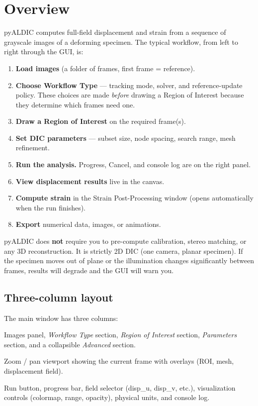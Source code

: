 \section{Overview}
\label{sec:overview}

pyALDIC computes full-field displacement and strain from a sequence
of grayscale images of a deforming specimen. The typical workflow,
from left to right through the GUI, is:

\begin{enumerate}
  \item \textbf{Load images} (a folder of frames, first frame = reference).
  \item \textbf{Choose Workflow Type} --- tracking mode, solver, and
    reference-update policy. These choices are made \emph{before}
    drawing a Region of Interest because they determine which frames
    need one.
  \item \textbf{Draw a Region of Interest} on the required frame(s).
  \item \textbf{Set DIC parameters} --- subset size, node spacing,
    search range, mesh refinement.
  \item \textbf{Run the analysis.} Progress, Cancel, and console log
    are on the right panel.
  \item \textbf{View displacement results} live in the canvas.
  \item \textbf{Compute strain} in the Strain Post-Processing window
    (opens automatically when the run finishes).
  \item \textbf{Export} numerical data, images, or animations.
\end{enumerate}

\begin{notebox}
pyALDIC does \textbf{not} require you to pre-compute calibration,
stereo matching, or any 3D reconstruction. It is strictly 2D DIC
(one camera, planar specimen). If the specimen moves out of plane or
the illumination changes significantly between frames, results will
degrade and the GUI will warn you.
\end{notebox}

\subsection{Three-column layout}

The main window has three columns:

\begin{description}[leftmargin=1.2cm,style=nextline]
  \item[Left sidebar]
    Images panel, \emph{Workflow Type} section, \emph{Region of
    Interest} section, \emph{Parameters} section, and a collapsible
    \emph{Advanced} section.
  \item[Centre canvas]
    Zoom / pan viewport showing the current frame with overlays
    (ROI, mesh, displacement field).
  \item[Right sidebar]
    Run button, progress bar, field selector (disp\_u, disp\_v,
    etc.), visualization controls (colormap, range, opacity),
    physical units, and console log.
\end{description}

